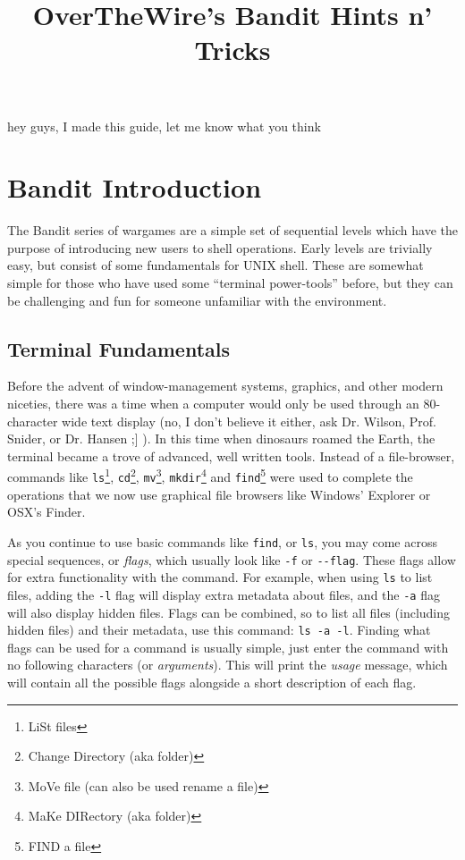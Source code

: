\documentclass[12pt]{article}
\begin{document}
\title{OverTheWire's Bandit Hints n' Tricks}
\author{}
\date{}

\maketitle

hey guys, I made this guide, let me know what you think


\section{Bandit Introduction}

The Bandit series of wargames are a simple set of sequential levels which have the purpose of introducing new users to shell operations.
Early levels are trivially easy, but consist of some fundamentals for UNIX shell.
These are somewhat simple for those who have used some ``terminal power-tools'' before, but they can be challenging and fun for someone unfamiliar with the environment.

\subsection{Terminal Fundamentals}

Before the advent of window-management systems, graphics, and other modern niceties, there was a time when a computer would only be used through an 80-character wide text display (no, I don't believe it either, ask Dr. Wilson, Prof. Snider, or Dr. Hansen ;] ).
In this time when dinosaurs roamed the Earth, the terminal became a trove of advanced, well written tools.
Instead of a file-browser, commands like \verb|ls|\footnote{LiSt files}, \verb|cd|\footnote{Change Directory (aka folder)}, \verb|mv|\footnote{MoVe file (can also be used rename a file)}, \verb|mkdir|\footnote{MaKe DIRectory (aka folder)} and \verb|find|\footnote{FIND a file} were used to complete the operations that we now use graphical file browsers like Windows' Explorer or OSX's Finder.

As you continue to use basic commands like \verb|find|, or \verb|ls|, you may come across special sequences, or \emph{flags}, which usually look like \verb|-f| or \verb|--flag|.
These flags allow for extra functionality with the command.
For example, when using \verb|ls| to list files, adding the \verb|-l| flag will display extra metadata about files, and the \verb|-a| flag will also display hidden files.
Flags can be combined, so to list all files (including hidden files) and their metadata, use this command: \verb|ls -a -l|.
Finding what flags can be used for a command is usually simple, just enter the command with no following characters (or \emph{arguments}).
This will print the \emph{usage} message, which will contain all the possible flags alongside a short description of each flag.
\end{document}
